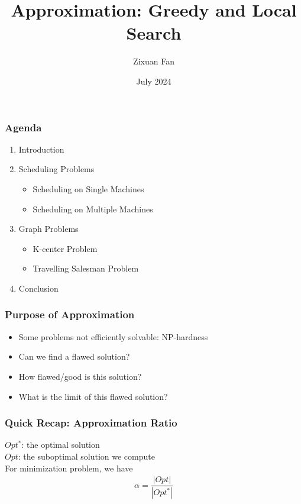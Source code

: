 \documentclass{beamer}
\title{Approximation: Greedy and Local Search}
\author{Zixuan Fan}
\institute{Technische Universität München}
\date{July 2024}
\begin{document}
\begin{frame}
    \titlepage   
\end{frame}

\begin{frame}
    \frametitle{Agenda}
    \begin{enumerate}
        \item Introduction
        \item Scheduling Problems
            \begin{itemize}
                \item Scheduling on Single Machines
                \item Scheduling on Multiple Machines 
            \end{itemize}
        \item Graph Problems 
            \begin{itemize}
                \item K-center Problem 
                \item Travelling Salesman Problem
            \end{itemize}
        \item Conclusion
    \end{enumerate}
\end{frame}

\begin{frame}
    \frametitle{Purpose of Approximation}
    \begin{itemize}
        \item<1-> Some problems not efficiently solvable: NP-hardness
        \item<2-> Can we find a flawed solution?
        \item<3-> How flawed/good is this solution?
        \item<4-> What is the limit of this flawed solution?
    \end{itemize}
\end{frame}

\begin{frame}
    \frametitle{Quick Recap: Approximation Ratio}
    $Opt^*$: the optimal solution \\ 
    $Opt$: the suboptimal solution we compute \\[10pt]
    For minimization problem, we have
    \begin{align*}
        \alpha = \dfrac{|Opt|}{|Opt^*|}
    \end{align*}
\end{frame}
\end{document}

